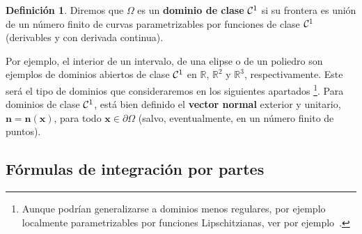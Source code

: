 \documentclass[11pt]{report}
\theoremstyle{plain}
\theoremstyle{definition}
\newtheorem{definition}[theorem]{Definición}
\newcommand{\R}{\ensuremath{\mathbb{R}}}
\newcommand{\xx}{\ensuremath{\mathbf{x}}\xspace}
\newcommand{\nn}{\ensuremath{\mathbf{n}}\xspace}
\newcommand{\classC}[2]{%
  \ensuremath{
   \ifthenelse{\equal{#2}{}}
    {\mathcal{C}^{#1}}
    {\mathcal{C}^{#1}(#2)}
  }
}
\begin{document}
\begin{definition}
	\label{def:dominio.clase.1}
  Diremos que $\Omega$ es un \textbf{dominio de clase} $\classC1{}$ si su frontera es unión de un número finito de curvas parametrizables por funciones de clase $\classC1{}$ (derivables y con derivada continua).
\end{definition}
Por ejemplo, el interior de un intervalo, de una elipse o de un poliedro son ejemplos de dominios abiertos de clase $\classC1{}$ en $\R$, $\R^2$ y $\R^3$, respectivamente.
Este será el tipo de dominios que consideraremos en los siguientes apartados%
\footnote{Aunque podrían generalizarse a dominios menos regulares, por ejemplo localmente parametrizables por funciones Lipschitzianas, ver por ejemplo~\cite{Ern-Guermond:04}.}.
Para dominios de clase $\classC1{}$, está bien definido el \textbf{vector normal} exterior y unitario, $\nn=\nn(\xx)$, para todo $\xx\in\partial\Omega$ (salvo, eventualmente, en un número finito de puntos).
\begin{center}
\end{center}

\subsection{Fórmulas de integración por partes}
\end{document}

